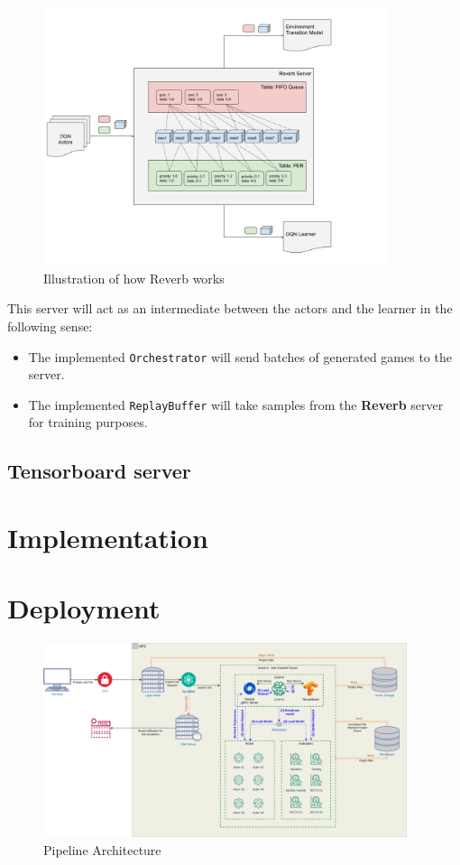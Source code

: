 \begin{figure}[H]
	\centering
	\includegraphics[width=0.9\textwidth]{Figures/ReverbTable.png}
	\caption{Illustration of how Reverb works}
\end{figure}
\FloatBarrier
This server will act as an intermediate between the actors and the learner in the following sense:
\begin{itemize}
	\item The implemented \texttt{Orchestrator} will send batches of generated games to the server.
	\item The implemented \texttt{ReplayBuffer} will take samples from the \textbf{Reverb} server for training purposes.
\end{itemize}

\subsection{Tensorboard server}
\section{Implementation}

\section{Deployment}


\begin{figure}
	\centering
	\includegraphics[width=0.95\textwidth]{Figures/AlphaZero.png}
	\caption{Pipeline Architecture}
\end{figure}
